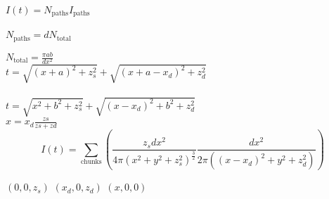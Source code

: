 \documentclass[11pt]{article}
\begin{document}
    
$I(t) = N_{\mathrm{paths}}I_{\mathrm{paths}}$ \\ \\
$N_{\mathrm{paths}} = dN_{\mathrm{total}}$    

$N_{\mathrm{total}} = \frac{\pi ab}{dx^2}$ \\

$t = \sqrt{(x+a)^2 + z_s^2} + \sqrt{(x+a-x_d)^2 + z_d^2}$ \\ \\
$t = \sqrt{x^2 + b^2 + z_s^2} + \sqrt{(x-x_d)^2 + b^2 + z_d^2}$\\ 


$x = x_d \frac{zs}{zs+zd}$  \\

$$I(t) = \sum_{\mathrm{chunks}} \left( \frac{z_s dx^2}{4 \pi (x^2 + y^2 + z_s^2)^{\frac{3}{2}}} 
    \frac{dx^2}{2 \pi((x-x_d)^2 + y^2 + z_d^2)} \right)$$
    
$(0, 0, z_s)$
$(x_d, 0, z_d)$    
$(x, 0, 0)$
    
\end{document}
